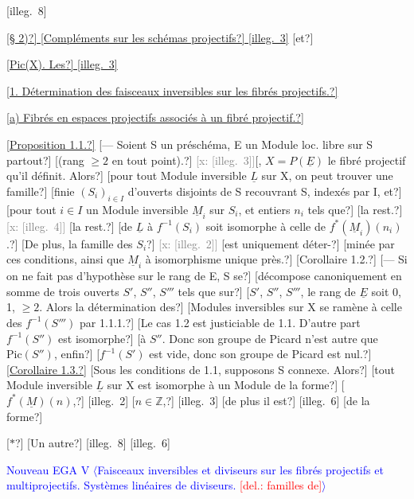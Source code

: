 \documentclass[11pt]{article}
\newcommand{\scanpage}[1]{\par\bigskip\noindent{\small\sffamily[scan #1]}\par}
\newcommand{\mspage}[1]{{\small\sffamily[p.\,#1]}}
\newcommand{\hand}[1]{\textcolor{blue}{#1}}
\newcommand{\inserted}[2][]{\textcolor{blue}{$\langle$#2$\rangle$}}
\newcommand{\deleted}[1]{\textcolor{red}{[\textsf{del.:} #1]}}
\newcommand{\xout}[1]{\textcolor{gray}{[\textsf{x:} #1]}}
\newcommand{\uline}[1]{\underline{#1}}
\newcommand{\unsure}[1]{[#1?]}
\newcommand{\illegible}[1]{[\textsf{illeg.\ #1}]}
\begin{document}
\illegible{8}

\uline{\unsure{§ 2)} \unsure{Compléments sur les schémas projectifs} \illegible{3}} \unsure{et}

\uline{\unsure{Pic(X). Les} \illegible{3}}

\uline{\unsure{1. Détermination des faisceaux inversibles sur les fibrés projectifs.}}

\uline{\unsure{a) Fibrés en espaces projectifs associés à un fibré projectif.}}

\uline{\unsure{Proposition 1.1.}} \unsure{--- Soient S un préschéma, E un Module loc. libre sur S partout}
\unsure{(rang $\geq 2$ en tout point).}
\xout{\illegible{3}}\unsure{, $X = P(\underline{E})$ le fibré projectif qu'il définit. Alors}
\unsure{pour tout Module inversible $\underline{L}$ sur X, on peut trouver une famille}
\unsure{finie $(S_i)_{i \in I}$ d'ouverts disjoints de S recouvrant S, indexés par I, et}
\unsure{pour tout $i \in I$ un Module inversible $\underline{M}_i$ sur $S_i$, et entiers $n_i$ tels que}
\unsure{la rest.} \xout{\illegible{4}} \unsure{la rest.}
\unsure{de $\underline{L}$ à $f^{-1}(S_i)$ soit isomorphe à celle de $f^*(\underline{M}_i)(n_i)$.}
\unsure{De plus, la famille des $S_i$} \xout{\illegible{2}} \unsure{est uniquement déter-}%
\unsure{minée par ces conditions, ainsi que $\underline{M}_i$ à isomorphisme unique près.}
\unsure{Corollaire 1.2.} \unsure{--- Si on ne fait pas d'hypothèse sur le rang de E, S se}
\unsure{décompose canoniquement en somme de trois ouverts $S'$, $S''$, $S'''$ tels que sur}
\unsure{$S'$, $S''$, $S'''$, le rang de $\underline{E}$ soit 0, 1, $\geq 2$. Alors la détermination des}
\unsure{Modules inversibles sur X se ramène à celle des $f^{-1}(S''')$ par 1.1.1.}
\unsure{Le cas 1.2 est justiciable de 1.1. D'autre part $f^{-1}(S'')$ est isomorphe}
\unsure{à $S''$. Donc son groupe de Picard n'est autre que $\mathrm{Pic}(S'')$, enfin}
\unsure{$f^{-1}(S')$ est vide, donc son groupe de Picard est nul.}
\uline{\unsure{Corollaire 1.3.}} \unsure{Sous les conditions de 1.1, supposons S connexe. Alors}
\unsure{tout Module inversible $\underline{L}$ sur X est isomorphe à un Module de la forme}
\unsure{$f^*(\underline{M})(n)$,} \illegible{2} \unsure{$n \in \mathbb{Z}$,} \illegible{3} \unsure{de plus il est}
\illegible{6} \unsure{de la forme}

\unsure{$*$}
\unsure{Un autre} \illegible{8}
\illegible{6}

\mspage{\hand{97}}

\clearpage
\scanpage{25/98}
\mspage{1}
\hand{Nouveau EGA V}
\inserted{Faisceaux inversibles et diviseurs sur les fibrés projectifs et multiprojectifs. Systèmes linéaires de diviseurs. \deleted{familles de}}
\end{document}
